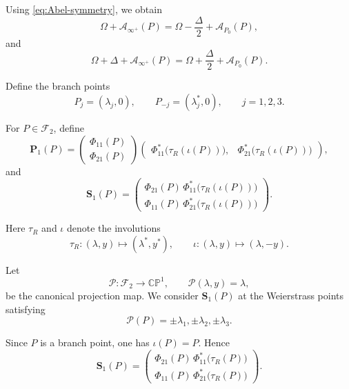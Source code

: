 \documentclass{amsart}
\newcounter{note}
\numberwithin{equation}{hw}
\begin{document}
Using \eqref{eq:Abel-symmetry}, we obtain
\begin{equation}
\Omega+\mathcal{A}_{\infty^+}(P)
=
\Omega
-
\frac{\Delta}{2}
+
\mathcal{A}_{P_0}(P),
\label{eq:shift-plus}
\end{equation}
and
\begin{equation}
\Omega+\Delta+\mathcal{A}_{\infty^+}(P)
=
\Omega
+
\frac{\Delta}{2}
+
\mathcal{A}_{P_0}(P).
\label{eq:shift-minus}
\end{equation}


Define the branch points
\begin{equation}
P_j
=
(\lambda_j,0),
\qquad
P_{-j}
=
(\lambda_j^*,0),
\qquad
j=1,2,3.
\label{eq:branch-points}
\end{equation}

For \(P\in\mathscr{F}_2\), define
\begin{equation}
\bm{P}_1(P)
=
\begin{pmatrix}
\Phi_{11}(P)\\[4pt]
\Phi_{21}(P)
\end{pmatrix}
\begin{pmatrix}
\Phi_{11}^*\bigl(\tau_R(\iota(P))\bigr),
&
\Phi_{21}^*\bigl(\tau_R(\iota(P))\bigr)
\end{pmatrix},
\label{eq:P1-definition}
\end{equation}
and
\begin{equation}
\bm{S}_1(P)
=
\begin{pmatrix}
\Phi_{21}(P)\,
\Phi_{11}^*\bigl(\tau_R(\iota(P))\bigr)
\\[6pt]
\Phi_{11}(P)\,
\Phi_{21}^*\bigl(\tau_R(\iota(P))\bigr)
\end{pmatrix}.
\label{eq:S1-definition}
\end{equation}

Here \(\tau_R\) and \(\iota\) denote the involutions
\begin{equation}
\tau_R:(\lambda,y)\mapsto(\lambda^*,y^*),
\qquad
\iota:(\lambda,y)\mapsto(\lambda,-y).
\label{eq:involutions}
\end{equation}

Let
\begin{equation}
\mathscr{P}:\mathscr{F}_2\to\mathbb{CP}^1,
\qquad
\mathscr{P}(\lambda,y)=\lambda,
\label{eq:projection-map}
\end{equation}
be the canonical projection map. We consider \(\bm{S}_1(P)\) at the Weierstrass points satisfying
\[
\mathscr{P}(P)
=
\pm\lambda_1,
\pm\lambda_2,
\pm\lambda_3.
\]

Since \(P\) is a branch point, one has \(\iota(P)=P\). Hence
\begin{equation}
\bm{S}_1(P)
=
\begin{pmatrix}
\Phi_{21}(P)\,
\Phi_{11}^*\bigl(\tau_R(P)\bigr)
\\[6pt]
\Phi_{11}(P)\,
\Phi_{21}^*\bigl(\tau_R(P)\bigr)
\end{pmatrix}.
\label{eq:S1-branch-points}
\end{equation}
\end{document}
